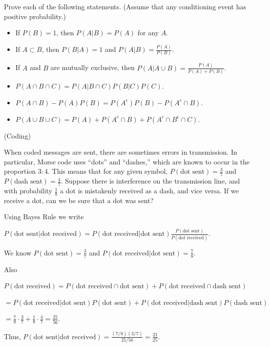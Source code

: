 \begin{Ejer} Prove each of the following statements. (Assume that any conditioning event has positive probability.)

\begin{itemize}
\item[(a)] If $P(B)=1$, then $P(A|B)=P(A)$ for any $A$.

\item[(b)] If $A \subset B$, then $P(B|A)=1$ and $P(A|B)=\frac{P(A)}{P(B)}.$

\item[(c)] If $A$ and $B$ are mutually exclusive, then $P(A|A \cup B)=\frac{P(A)}{P(A)+P(B)}.$

\item[(d)] $P(A \cap B \cap C)=P(A|B \cap C)P(B|C)P(C).$

\item[(e)] $P(A\cap B) - P(A)P(B)=P(A^c)P(B) - P(A^c\cap B).$

\item[(f)] $P(A\cup B\cup C)=P(A)+P(A^c\cap B)+P(A^c\cap B^c\cap C).$

\end{itemize}
\end{Ejer}


\begin{Ejer}(Coding)

When coded messages are sent, there are sometimes errors in transmission. In particular, Morse code uses ``dots'' and ``dashes,'' which are known to occur in the proportion $3:4$. This means that for any given symbol, $P(\text{dot sent}) = \frac{3}{7}$ and $P(\text{dash sent}) = \frac{4}{7}.$ Suppose there is interference on the transmission line, and with probability $\frac18$ a dot is mistakenly received as a dash, and vice versa. If we receive a dot, can we be sure that a dot was sent?

Using Bayes Rule we write

$P(\text{dot sent}|\text{dot received})=P(\text{dot received}|\text{dot sent})\frac{P(\text{dot sent})}{P(\text{dot received})}$. 

We know $P(\text{dot sent})=\frac37$ and $P(\text{dot received}|\text{dot sent})=\frac78$.

Also

$P(\text{dot received})=P(\text{dot received} \cap \text{dot sent})+P(\text{dot received} \cap \text{dash sent})$

$=P(\text{dot received}|\text{dot sent})P(\text{dot sent})+P(\text{dot received}|\text{dash sent})P(\text{dash sent})$

$=\frac78 \cdot \frac37+\frac18 \cdot \frac47=\frac{25}{56}$.

Thus, $P(\text{dot sent}|\text{dot received})=\frac{(7/8)(3/7)}{25/56}=\frac{21}{25}$.
\end{Ejer}

